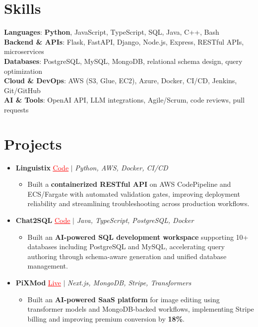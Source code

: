 \documentclass[letterpaper,10pt]{article}
\newcommand{\resumeItem}[1]{\item\small{{#1 \vspace{-2pt}}}}
\newcommand{\resumeProjectHeading}[1]{\item \small #1 \vspace{-2pt}}
\newcommand{\resumeSubHeadingListStart}{\begin{itemize}[leftmargin=0.0in, label={}]}
\newcommand{\resumeSubHeadingListEnd}{\end{itemize}}
\newcommand{\resumeProjItemListStart}{\begin{itemize}[leftmargin=0.15in,label=\textbullet,itemsep=0pt,topsep=0pt,parsep=0pt,partopsep=0pt]}
\newcommand{\resumeProjItemListEnd}{\end{itemize}\vspace{-4pt}}
\begin{document}
\section{Skills}
\begin{itemize}[leftmargin=0.15in, label={}]
\small{\item{
\textbf{Languages}: \textbf{Python}, JavaScript, TypeScript, SQL, Java, C++, Bash \\
\textbf{Backend \& APIs}: Flask, FastAPI, Django, Node.js, Express, RESTful APIs, microservices \\
\textbf{Databases}: PostgreSQL, MySQL, MongoDB, relational schema design, query optimization \\
\textbf{Cloud \& DevOps}: AWS (S3, Glue, EC2), Azure, Docker, CI/CD, Jenkins, Git/GitHub \\
\textbf{AI \& Tools}: OpenAI API, LLM integrations, Agile/Scrum, code reviews, pull requests
}}
\end{itemize}
\vspace{-16pt}
\section{Projects}
\resumeSubHeadingListStart
\vspace{-2pt}
\resumeProjectHeading{\textbf{Linguistix} {\href{https://github.com/SAHAJ-BHADJA/Linguistix}{\textcolor{red}{\underline{Code}}}} $|$ \emph{Python, AWS, Docker, CI/CD}}
\resumeProjItemListStart
\resumeItem{Built a \textbf{containerized RESTful API} on AWS CodePipeline and ECS/Fargate with automated validation gates, improving deployment reliability and streamlining troubleshooting across production workflows.}
\resumeProjItemListEnd
\vspace{3pt}
\resumeProjectHeading{\textbf{Chat2SQL} {\href{https://github.com/SAHAJ-BHADJA/Chat2SQL}{\textcolor{red}{\underline{Code}}}} $|$ \emph{Java, TypeScript, PostgreSQL, Docker}}
\resumeProjItemListStart
\resumeItem{Built an \textbf{AI-powered SQL development workspace} supporting 10+ databases including PostgreSQL and MySQL, accelerating query authoring through schema-aware generation and unified database management.}
\resumeProjItemListEnd
\vspace{3pt}
\resumeProjectHeading{\textbf{PiXMod} {\href{https://pixmod.vercel.app/}{\textcolor{red}{\underline{Live}}}} $|$ \emph{Next.js, MongoDB, Stripe, Transformers}}
\resumeProjItemListStart
\resumeItem{Built an \textbf{AI-powered SaaS platform} for image editing using transformer models and MongoDB-backed workflows, implementing Stripe billing and improving premium conversion by \textbf{18\%}.}
\resumeProjItemListEnd
\resumeSubHeadingListEnd
\end{document}
